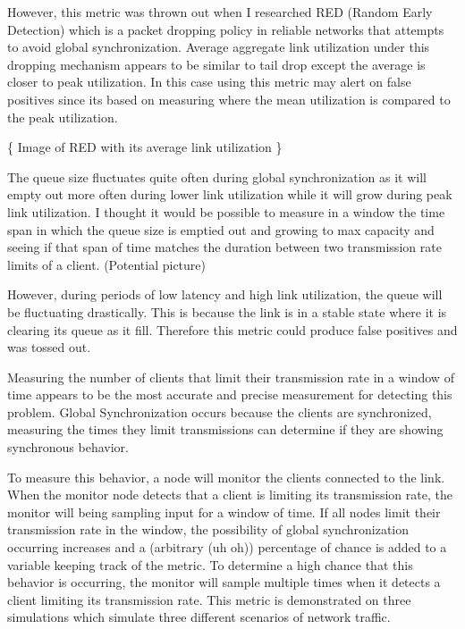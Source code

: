 \documentclass{article}
\begin{document}
	\indent However, this metric was thrown out when I researched RED (Random Early Detection) which is a packet dropping policy in reliable networks that attempts to avoid global synchronization. Average aggregate link utilization under this dropping mechanism appears to be similar to tail drop except the average is closer to peak utilization. In this case using this metric may alert on false positives since its based on measuring where the mean utilization is compared to the peak utilization. \newline
	
																			\{ Image of RED with its average link utilization \}\newline
	
	The queue size fluctuates quite often during global synchronization as it will empty out more often during lower link utilization while it will grow during peak link utilization. I thought it would be possible to measure in a window the time span in which the queue size is emptied out and growing to max capacity and seeing if that span of time matches the duration between two transmission rate limits of a client.\newline
	(Potential picture)\newline
	
	However, during periods of low latency and high link utilization, the queue will be fluctuating drastically. This is because the link is in a stable state where it is clearing its queue as it fill. Therefore this metric could produce false positives and was tossed out.\newline
	
	Measuring the number of clients that limit their transmission rate in a window of time appears to be the most accurate and precise measurement for detecting this problem. Global Synchronization occurs because the clients are synchronized, measuring the times they limit transmissions can determine if they are showing synchronous behavior.\newline
																	
	To measure this behavior, a node will monitor the clients connected to the link. When the monitor node detects that a client is limiting its transmission rate, the monitor will being sampling input for a window of time. If all nodes limit their transmission rate in the window, the possibility of global synchronization occurring increases and a (arbitrary (uh oh)) percentage of chance is added to a variable keeping track of the metric. To determine a high chance that this behavior is occurring, the monitor will sample multiple times when it detects a client limiting its transmission rate.\newline
	This metric is demonstrated on three simulations which simulate three different scenarios of network traffic.\newline
	
\end{document}
